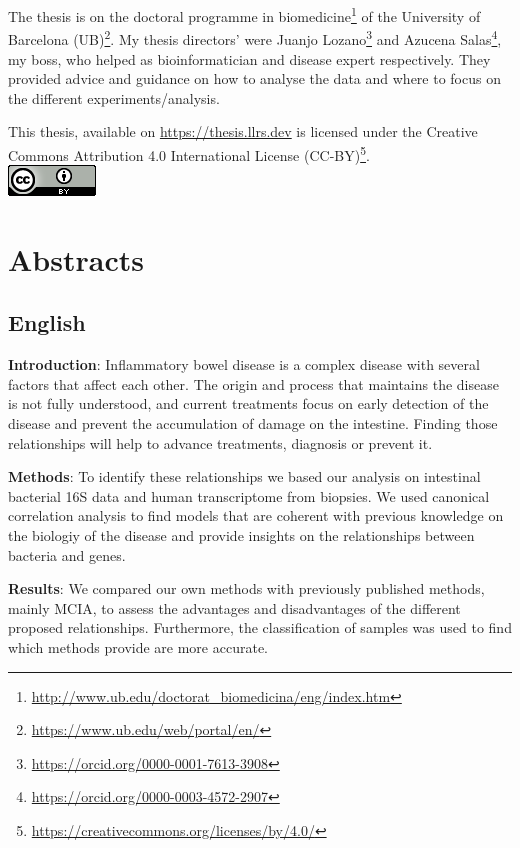 \documentclass[
  a4paper,
]{book}
\DeclareRobustCommand{\href}[2]{#2\footnote{\url{#1}}}
\begin{document}
The thesis is on the \href{http://www.ub.edu/doctorat_biomedicina/eng/index.htm}{doctoral programme in biomedicine} of the \href{https://www.ub.edu/web/portal/en/}{University of Barcelona (UB)}.
My thesis directors' were \href{https://orcid.org/0000-0001-7613-3908}{Juanjo Lozano} and \href{https://orcid.org/0000-0003-4572-2907}{Azucena Salas}, my boss, who helped as bioinformatician and disease expert respectively.
They provided advice and guidance on how to analyse the data and where to focus on the different experiments/analysis.

This thesis, available on \url{https://thesis.llrs.dev} is licensed under the \href{https://creativecommons.org/licenses/by/4.0/}{Creative Commons Attribution 4.0 International License (CC-BY)}.\\
\includegraphics{images/by.png}

\hypertarget{abstracts}{%
\chapter*{Abstracts}\label{abstracts}}

\hypertarget{english}{%
\section*{English}\label{english}}

\textbf{Introduction}: Inflammatory bowel disease is a complex disease with several factors that affect each other.
The origin and process that maintains the disease is not fully understood, and current treatments focus on early detection of the disease and prevent the accumulation of damage on the intestine.
Finding those relationships will help to advance treatments, diagnosis or prevent it.

\textbf{Methods}: To identify these relationships we based our analysis on intestinal bacterial 16S data and human transcriptome from biopsies.
We used canonical correlation analysis to find models that are coherent with previous knowledge on the biologiy of the disease and provide insights on the relationships between bacteria and genes.

\textbf{Results}: We compared our own methods with previously published methods, mainly MCIA, to assess the advantages and disadvantages of the different proposed relationships.
Furthermore, the classification of samples was used to find which methods provide are more accurate.
\end{document}

